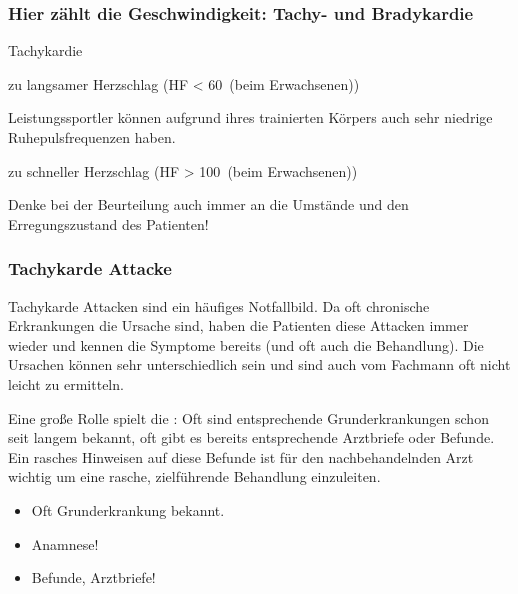 \subsubsection{Hier zählt die Geschwindigkeit: Tachy- und Bradykardie} 

\begin{labeling}[~--]{Tachykardie}
  \item[\T{Bradykardie}]  zu langsamer Herzschlag
  ({HF \textless} 60\, {\tiny (beim Erwachsenen)})
  
  Leistungssportler können aufgrund ihres trainierten Körpers auch sehr
  niedrige Ruhepulsfrequenzen haben.
  \item[\T{Tachykardie}]  zu schneller
  Herzschlag
  (HF {\textgreater} 100\, {\tiny (beim
  Erwachsenen)})
\end{labeling}



Denke bei der Beurteilung auch immer an die Umstände und den
Erregungszustand des Patienten!



\subsubsection{Tachykarde Attacke}



{
Tachykarde Attacken sind ein häufiges Notfallbild. Da oft chronische
Erkrankungen die Ursache sind, haben die Patienten diese
Attacken immer wieder und kennen die Symptome bereits (und oft auch die Behandlung). Die
Ursachen können sehr unterschiedlich sein und sind auch vom Fachmann oft nicht
leicht zu ermitteln. 

Eine große Rolle spielt die : Oft sind entsprechende
Grunderkrankungen schon seit langem bekannt, oft gibt es bereits entsprechende Arztbriefe oder
Befunde. Ein rasches Hinweisen auf diese Befunde ist für den nachbehandelnden
Arzt wichtig um eine rasche, zielführende Behandlung einzuleiten.
}{
\begin{itemize}
  \item Oft Grunderkrankung bekannt.
  \item Anamnese!
  \item Befunde, Arztbriefe!
\end{itemize}
}{}{}{}

